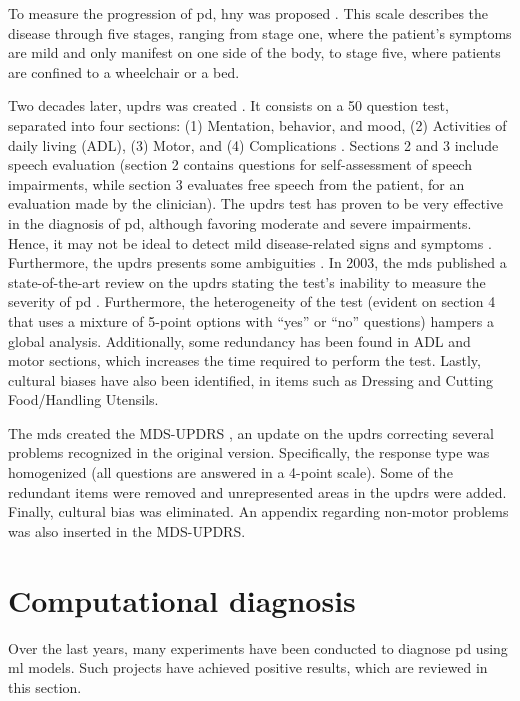 To measure the progression of \gls{pd}, \gls{hny} was proposed \cite{hoehn_yahr}. This scale describes the disease through five stages, ranging from stage one, where the patient's symptoms are mild and only manifest on one side of the body, to stage five, where patients are confined to a wheelchair or a bed.

Two decades later, \gls{updrs} was created \cite{fahn_updrs}. It consists on a 50 question test, separated into four sections: (1) Mentation, behavior, and mood, (2) Activities of daily living (ADL), (3) Motor, and (4) Complications \cite{updrs}. Sections 2 and 3 include speech evaluation (section 2 contains questions for self-assessment of speech impairments, while section 3 evaluates free speech from the patient, for an evaluation made by the clinician). The \gls{updrs} test has proven to be very effective in the diagnosis of \gls{pd}, although favoring moderate and severe impairments. Hence, it may not be ideal to detect mild disease-related signs and symptoms \cite{updrs_bias}.
Furthermore, the \gls{updrs} presents some ambiguities \cite{updrs_bias}. In 2003, the \gls{mds} published a state-of-the-art review on the \gls{updrs} stating the test's inability to measure the severity of \gls{pd} \cite{mds_updrs}. Furthermore, the heterogeneity of the test (evident on section 4 that uses a mixture of 5-point options with ``yes'' or ``no'' questions) hampers a global analysis. Additionally, some redundancy has been found in ADL and motor sections, which increases the time required to perform the test. Lastly, cultural biases have also been identified, in items such as Dressing and Cutting Food/Handling Utensils.

The \gls{mds} created the MDS-UPDRS \cite{mds_updrs}, an update on the \gls{updrs} correcting several problems recognized in the original version. Specifically, the response type was homogenized (all questions are answered in a 4-point scale). Some of the redundant items were removed and unrepresented areas in the \gls{updrs} were added. Finally, cultural bias was eliminated. An appendix regarding non-motor problems was also inserted in the MDS-UPDRS.

\section{Computational diagnosis}

Over the last years, many experiments have been conducted to diagnose \gls{pd} using \gls{ml} models. Such projects have achieved positive results, which are reviewed in this section.

